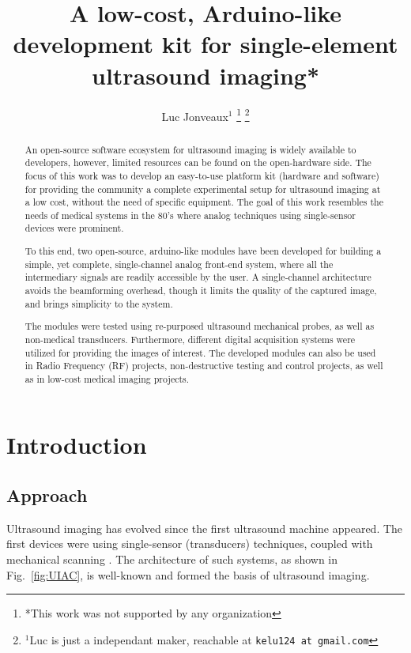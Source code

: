 \documentclass[letterpaper, 10 pt, conference]{ieeeconf} %
\title{\LARGE \bf
A low-cost, Arduino-like development kit for single-element ultrasound imaging*
}
\author{Luc Jonveaux$^{1}$ %
\thanks{*This work was not supported by any organization}%
\thanks{$^{1}$Luc is just a independant maker, reachable at 
    {\tt\small kelu124 at gmail.com}%
}
}
\begin{document}
\maketitle
\thispagestyle{empty}
\pagestyle{empty}


\begin{abstract}

An open-source software ecosystem for ultrasound imaging is widely available to developers, however, limited resources can be found on the open-hardware side. The focus of this work was to develop an easy-to-use platform kit (hardware and software) for providing the community a complete experimental setup for ultrasound imaging at a low cost, without the need of specific equipment. The goal of this work resembles the needs of medical systems in the 80's where analog techniques using single-sensor devices were prominent.

To this end, two open-source, arduino-like modules have been developed for building a simple, yet complete, single-channel analog front-end system, where all the intermediary signals are readily accessible by the user. A single-channel architecture avoids the beamforming overhead, though it limits the quality of the captured image, and brings simplicity to the system. 

The modules were tested using re-purposed ultrasound mechanical probes, as well as non-medical transducers. Furthermore, different digital acquisition systems were utilized for providing the images of interest. The developed modules can also be used in Radio Frequency (RF) projects, non-destructive testing and control projects, as well as in low-cost medical imaging projects.

\end{abstract}


\section{Introduction}

\subsection{Approach}

Ultrasound imaging has evolved since the first ultrasound machine appeared. The first devices were using single-sensor (transducers) techniques, coupled with mechanical scanning \cite{c25}. The architecture of such systems, as shown in Fig.~\ref{fig:UIAC}, is well-known and formed the basis of ultrasound imaging.
\end{document}
